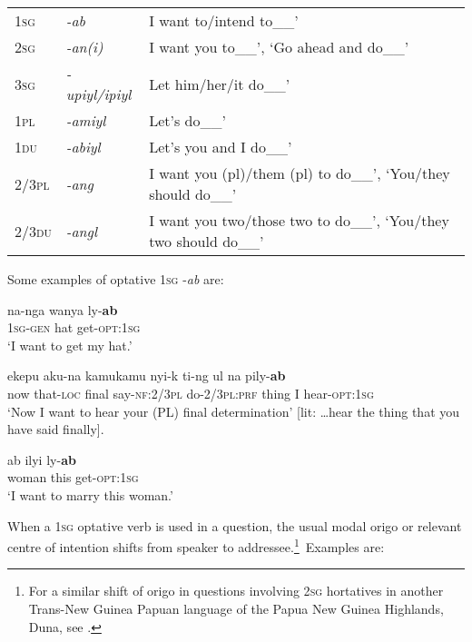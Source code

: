 \documentclass[output=paper]{langsci/langscibook}
\begin{document}
\begin{table}
\begin{tabularx}{\textwidth}{lll}
1\textsc{sg}	&	\textit{-ab} 	&	I want to/intend to\_\_’	\\
2\textsc{sg}	&	\textit{-an(i)}  	&	I want you to\_\_’, ‘Go ahead and do\_\_’	\\
3\textsc{sg}	&	\textit{-upiyl/ipiyl}	&	Let him/her/it do\_\_’	\\
1\textsc{pl}	&	\textit{-amiyl}	&	Let’s do\_\_’	\\
1\textsc{du}	&	\textit{-abiyl}	&	Let’s you and I do\_\_’	\\
2/3\textsc{pl}	&	\textit{-ang}	&	I want you (pl)/them (pl) to do\_\_’, ‘You/they should do\_\_’	\\
2/3\textsc{du}	&	\textit{-angl}	&	I want you two/those two to do\_\_’, ‘You/they two should do\_\_’	\\
\end{tabularx}
\end{table}

Some examples of optative 1\textsc{sg} -\textit{ab} are:

\begin{exe}
	\ex \label{ex:ar7}
	\gll na-nga wanya ly-\textbf{ab}\\
	1\textsc{sg}-\textsc{gen} hat get-\textsc{opt}:1\textsc{sg}\\
	\trans ‘I want to get my hat.’
\end{exe}


\begin{exe}
	\ex \label{ex:ar8}
	\gll ekepu aku-na kamukamu nyi-k ti-ng ul na pily-\textbf{ab}\\
	now	that-\textsc{loc} final say-\textsc{nf}:2/3\textsc{pl}	do-2/3\textsc{pl}:\textsc{prf} thing I hear-\textsc{opt}:1\textsc{sg}\\
	\trans ‘Now I want to hear your (PL) final determination’ [lit: …hear the thing that you have said finally].
\end{exe}

\begin{exe}
	\ex \label{ex:ar9}
	\gll ab 	ilyi ly-\textbf{ab}\\
	woman	this  get-\textsc{opt}:1\textsc{sg}\\
	\trans ‘I want to marry this woman.’
\end{exe}

When a 1\textsc{sg} optative verb is used in a question, the usual modal origo or relevant centre of intention shifts from speaker to addressee.\footnote{For a similar shift of origo in questions involving 2\textsc{sg} hortatives in another Trans-New Guinea Papuan language of the Papua New Guinea Highlands, Duna, see \citealt[448--450]{SanRoque2008}.} Examples are:
\end{document}
